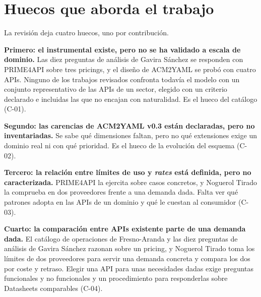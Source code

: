 \section{Huecos que aborda el trabajo}
\label{sec:estado:analisis}

La revisión deja cuatro huecos, uno por contribución.

\textbf{Primero: el instrumental existe, pero no se ha validado a escala
de dominio.} Las diez preguntas de análisis de Gavira Sánchez se
responden con PRIME4API sobre tres pricings, y el diseño de ACM2YAML se
probó con cuatro APIs. Ninguno de los trabajos revisados confronta
todavía el modelo con un conjunto representativo
de las APIs de un sector, elegido con un criterio declarado e incluidas
las que no encajan con naturalidad. Es el hueco del catálogo (C-01).

\textbf{Segundo: las carencias de ACM2YAML v0.3 están declaradas, pero
no inventariadas.} Se sabe qué dimensiones faltan, pero no qué
extensiones exige un dominio real ni con qué prioridad. Es el hueco de la
evolución del esquema (C-02).

\textbf{Tercero: la relación entre límites de uso y \textit{rates} está
definida, pero no caracterizada.} PRIME4API la ejercita sobre casos
concretos, y Noguerol Tirado la comprueba en dos proveedores frente a una
demanda dada. Falta ver qué patrones adopta en las APIs de un dominio y
qué le cuestan al consumidor (C-03).

\textbf{Cuarto: la comparación entre APIs existente parte de una demanda
dada.} El catálogo de operaciones de Fresno-Aranda y las diez preguntas
de análisis de Gavira Sánchez razonan sobre un pricing, y Noguerol Tirado
toma los límites de dos proveedores para servir una demanda concreta y
compara los dos por coste y retraso. Elegir una API para unas necesidades dadas exige
preguntas funcionales y no funcionales y un procedimiento para
responderlas sobre Datasheets comparables (C-04).
